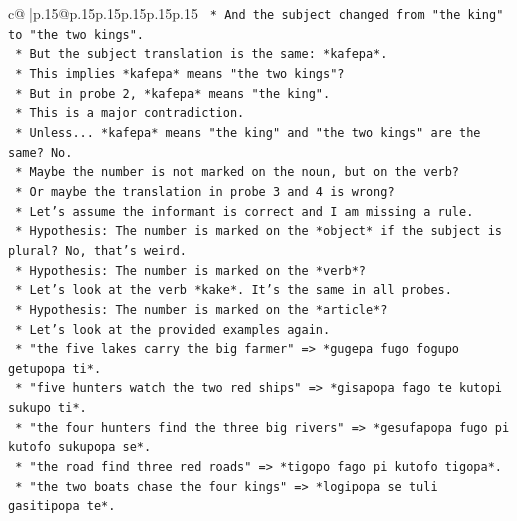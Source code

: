 \documentclass{article}
\begin{document}
{\begin{supertabular}{c@{$\;$}|p{.15\linewidth}@{}p{.15\linewidth}p{.15\linewidth}p{.15\linewidth}p{.15\linewidth}p{.15\linewidth}}
{{{\texttt{                    *   And the subject changed from "the king" to "the two kings".} \\
\texttt{                    *   But the subject translation is the same: *kafepa*.} \\
\texttt{                    *   This implies *kafepa* means "the two kings"?} \\
\texttt{                    *   But in probe 2, *kafepa* means "the king".} \\
\texttt{                    *   This is a major contradiction.} \\
\texttt{                    *   Unless... *kafepa* means "the king" and "the two kings" are the same? No.} \\
\texttt{                    *   Maybe the number is not marked on the noun, but on the verb?} \\
\texttt{                    *   Or maybe the translation in probe 3 and 4 is wrong?} \\
\texttt{                    *   Let's assume the informant is correct and I am missing a rule.} \\
\texttt{                    *   Hypothesis: The number is marked on the *object* if the subject is plural? No, that's weird.} \\
\texttt{                    *   Hypothesis: The number is marked on the *verb*?} \\
\texttt{                    *   Let's look at the verb *kake*. It's the same in all probes.} \\
\texttt{                    *   Hypothesis: The number is marked on the *article*?} \\
\texttt{                    *   Let's look at the provided examples again.} \\
\texttt{                    *   "the five lakes carry the big farmer" => *gugepa fugo fogupo getupopa ti*.} \\
\texttt{                    *   "five hunters watch the two red ships" => *gisapopa fago te kutopi sukupo ti*.} \\
\texttt{                    *   "the four hunters find the three big rivers" => *gesufapopa fugo pi kutofo sukupopa se*.} \\
\texttt{                    *   "the road find three red roads" => *tigopo fago pi kutofo tigopa*.} \\
\texttt{                    *   "the two boats chase the four kings" => *logipopa se tuli gasitipopa te*.} \\
}}}
\end{supertabular}}
\end{document}
